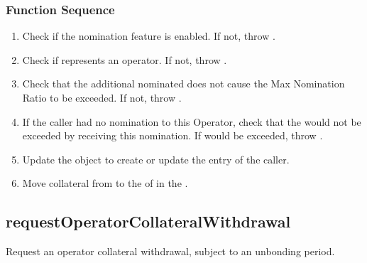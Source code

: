\documentclass[a4paper,10pt,english]{sphinxmanual}
\begin{document}
\subsubsection{Function Sequence}
\label{\detokenize{spec/nomination:id16}}\begin{enumerate}
%
\item {} 
Check if the nomination feature is enabled. If not, throw .

\item {} 
Check if  represents an operator. If not, throw .

\item {} 
Check that the additional nominated  does not cause the Max Nomination Ratio to be exceeded. If not, throw .

\item {} 
If the caller had no nomination to this Operator, check that the  would not be exceeded by receiving this nomination. If  would be exceeded, throw .

\item {} 
Update the  object to create or update the  entry of the caller.

\item {} 
Move collateral from  to the  of  in the {\hyperref[\detokenize{spec/vault-registry:vault-registry}]{}}.

\end{enumerate}


\subsection{requestOperatorCollateralWithdrawal}
\label{\detokenize{spec/nomination:requestoperatorcollateralwithdrawal}}\label{\detokenize{spec/nomination:id17}}
Request an operator collateral withdrawal, subject to an unbonding period.
\end{document}
